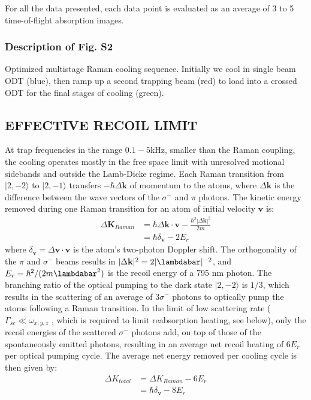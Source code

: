 \documentclass{article}
\begin{document}
For all the data presented, each data point is evaluated as an average of 3 to 5 time-of-flight absorption images.

\subsubsection{Description of Fig. S2}
Optimized multistage Raman cooling sequence. Initially we cool in single beam ODT (blue), then ramp up a second trapping beam (red) to load into a crossed ODT for the final stages of cooling (green).

\subsection{EFFECTIVE RECOIL LIMIT}
At trap frequencies in the range $0.1-5$kHz, smaller than the Raman coupling, the cooling operates mostly in the free space limit with unresolved motional sidebands and outside the Lamb-Dicke regime. Each Raman transition from $\vert 2, -2 \rangle$ to $\vert 2, -1 \rangle$ transfers $-\hbar \Delta \mathbf{k}$ of momentum to the atoms, where $\Delta \mathbf{k}$ is the difference between the wave vectors of the $\sigma^-$ and $\pi$ photons. The kinetic energy removed during one Raman transition for an atom of initial velocity $\mathbf{v}$ is:
\begin{align}
    \Delta \mathbf{K}_{Raman}&=\hbar \Delta \mathbf{k} \cdot \mathbf{v} - \frac{\hbar^2 | \Delta \mathbf{k} | ^2}{2m} \\
    &= \hbar \delta_{\mathbf{v}} - 2 E_r
\end{align}
where $\delta_\mathbf{v} = \Delta \mathbf{v} \cdot \mathbf{v}$ is the atom's two-photon Doppler shift. The orthogonality of the $\pi$ and $\sigma^-$ beams results in $\vert \Delta \mathbf{k} \vert ^2 = 2 \vert \lambdabar \vert ^{-2}$, and $E_r = \hbar^2 / (2m \lambdabar^2)$ is the recoil energy of a 795 nm photon. The branching ratio of the optical pumping to the dark state $\vert 2, -2 \rangle$ is $1/3$, which results in the scattering of an average of $3\sigma^-$ photons to optically pump the atoms following a Raman transition. In the limit of low scattering rate ($\Gamma_{sc} \ll \omega_{x,y,z}$ , which is required to limit reabsorption heating, see below), only the recoil energies of the scattered $\sigma^-$ photons add, on top of those of the spontaneously emitted photons, resulting in an average net recoil heating of $6E_r$ per optical pumping cycle. The average net energy removed per cooling cycle is then given by:
\begin{align}
    \Delta K_{total}&=\Delta K_{Raman} - 6E_r \\
    &= \hbar \delta_{\mathbf{v}} - 8 E_r
\end{align}
\end{document}
